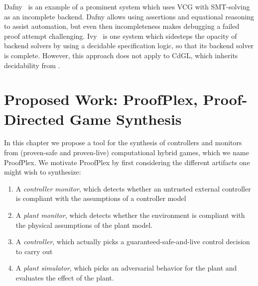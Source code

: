 \documentclass[12pt]{cmuthesis}
\theoremstyle{definition}
\theoremstyle{remark}
\newcommand{\CdGL}{\textsf{CdGL}\xspace}
\newcommand{\ProofPlex}{ProofPlex\xspace}
\begin{document}
Dafny~\cite{DBLP:conf/lpar/Leino10} is an example of a prominent system which uses VCG with SMT-solving as an incomplete backend.
Dafny allows using assertions and equational reasoning to assist automation, but even then incompleteness makes debugging a failed proof attempt challenging.
Ivy~\cite{DBLP:conf/pldi/PadonMPSS16} is one system which sidesteps the opacity of backend solvers by using a decidable specification logic, so that its backend solver is complete.
However, this approach does not apply to \CdGL, which inherits decidability from \dGL.

\chapter{Proposed Work: \ProofPlex, Proof-Directed Game Synthesis}
\label{ch:proofplex}
In this chapter we propose a tool for the synthesis of controllers and monitors from (proven-safe and proven-live) computational hybrid games, which we name \ProofPlex.
We motivate \ProofPlex by first considering the different artifacts one might wish to synthesize:
\begin{enumerate}
\item A \emph{controller monitor}, which detects whether an untrusted external controller is compliant with the assumptions of a controller model
\item A \emph{plant monitor}, which detects whether the environment is compliant with the physical assumptions of the plant model.
\item A \emph{controller}, which actually picks a guaranteed-safe-and-live control decision to carry out
\item A \emph{plant simulator}, which picks an adversarial behavior for the plant and evaluates the effect of the plant.
\end{enumerate}
\end{document}
